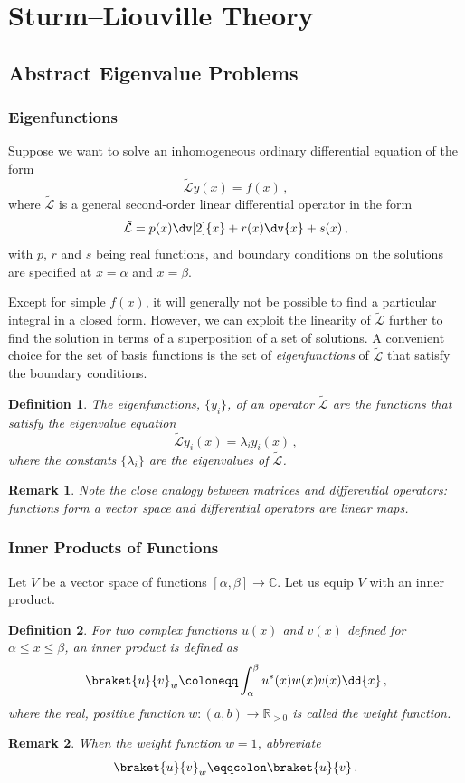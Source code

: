 \documentclass{article}
\theoremstyle{plain}\theoremheaderfont{\normalfont\itshape}\theorembodyfont{\rmfamily}\theoremseparator{.}\newtheorem*{rem}{Remark}\newtheorem*{ex}{Example}\newtheorem*{proof}{Proof}\newtheorem*{altp}{Alternative proof}
\theoremstyle{plain}\theoremheaderfont{\normalfont\bfseries}\theorembodyfont{\rmfamily}\theoremseparator{.}\newtheorem{thm}{Theorem}[section]\newtheorem{lem}[thm]{Lemma}\newtheorem{prop}[thm]{Proposition}\newtheorem*{cor}{Corollary}\newtheorem{defn}[thm]{Definition}\newtheorem{clm}[thm]{Claim}\newtheorem{clminproof}{Claim}
\theoremstyle{break}\theoremheaderfont{\normalfont\itshape}\theorembodyfont{\rmfamily}\theoremseparator{.\medskip}\newtheorem*{proofskip}{Proof}\newtheorem*{exs}{Examples}\newtheorem*{rems}{Remarks}
\theoremstyle{break}\theoremheaderfont{\normalfont\bfseries}\theorembodyfont{\rmfamily}\theoremseparator{.\medskip}\newtheorem{lemskip}[thm]{Lemma}\newtheorem{defnskip}[thm]{Definition}\newtheorem{propskip}[thm]{Proposition}\newtheorem{thmskip}[thm]{Theorem}
\numberwithin{equation}{section}
\begin{document}
	\section{Sturm--Liouville Theory}
	\subsection{Abstract Eigenvalue Problems}
	\subsubsection{Eigenfunctions}
	Suppose we want to solve an inhomogeneous ordinary differential equation of the form
	\[\tilde{\mathcal{L}}y(x)=f(x)\,,\]
	where \(\tilde{\mathcal{L}}\) is a general second-order linear differential operator in the form
	\[\tilde{\mathcal{L}}=p(x)\dv[2]{x}+r(x)\dv{x}+s(x)\,,\]
	with \(p\), \(r\) and \(s\) being real functions, and boundary conditions on the solutions are specified at \(x=\alpha\) and \(x=\beta\).

	Except for simple \(f(x)\), it will generally not be possible to find a particular integral in a closed form. However, we can exploit the linearity of \(\tilde{\mathcal{L}}\) further to find the solution in terms of a superposition of a set of solutions. A convenient choice for the set of basis functions is the set of \textit{eigenfunctions} of \(\tilde{\mathcal{L}}\) that satisfy the boundary conditions.
	
	\begin{defn}
		The \textit{eigenfunctions}, \(\{y_i\}\), of an operator \(\tilde{\mathcal{L}}\) are the functions that satisfy the \textit{eigenvalue equation}
		\[\tilde{\mathcal{L}}y_i(x)=\lambda_i y_i(x)\,,\]
		where the constants \(\{\lambda_i\}\) are the \textit{eigenvalues} of \(\tilde{\mathcal{L}}\).
	\end{defn}
	
	\begin{rem}
		Note the close analogy between matrices and differential operators: functions form a vector space and differential operators are linear maps.
	\end{rem}

	\subsubsection{Inner Products of Functions}
	Let \(V\) be a vector space of functions \([\alpha,\beta]\to\mathbb{C}\). Let us equip \(V\) with an inner product.
	\begin{defn}
		For two complex functions \(u(x)\) and \(v(x)\) defined for \(\alpha\le x\le\beta\), an \textit{inner product} is defined as
		\[\braket{u}{v}_w\coloneqq\int_{\alpha}^{\beta}u^*(x)w(x)v(x)\dd{x}\,,\]
		where the real, positive function \(w:(a,b)\to\mathbb{R}_{>0}\) is called the \textit{weight function}.
	\end{defn}
	\begin{rem}
		When the weight function \(w=1\), abbreviate
		\[\braket{u}{v}_w\eqqcolon\braket{u}{v}\,.\]
	\end{rem}
	
\end{document}
